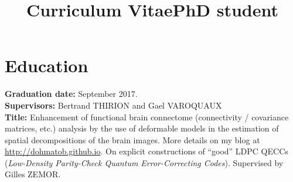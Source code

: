 \documentclass[11pt,a4paper,roman,unicode]{moderncv}
\title{Curriculum Vitae}
\title{PhD student}
\begin{document}
\maketitle
\section{Education}
        {
          \textbf{Graduation date:} September 2017.\\
          \textbf{Supervisors:} Bertrand THIRION and Gael VAROQUAUX\\
          \textbf{Title:} Enhancement of functional brain connectome (connectivity / covariance matrices, etc.) analysis
          by the use of deformable models in the estimation of spatial decompositions of the brain images.
         More details on my blog at \url{http://dohmatob.github.io}.}
{On explicit constructions of ``good'' LDPC QECCs (\emph{Low-Density Parity-Check Quantum Error-Correcting Codes}). Supervised by Gilles ZEMOR.}
{}
\end{document}
